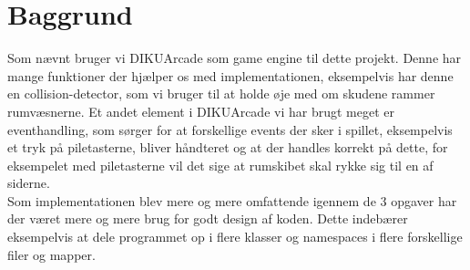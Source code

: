 \section{Baggrund}
Som nævnt bruger vi DIKUArcade som game engine til dette projekt. Denne har mange funktioner der hjælper os med implementationen, eksempelvis har denne en collision-detector, som vi bruger til at holde øje med om skudene rammer rumvæsnerne. Et andet element i DIKUArcade vi har brugt meget er eventhandling, som sørger for at forskellige events der sker i spillet, eksempelvis et tryk på piletasterne, bliver håndteret og at der handles korrekt på dette, for eksempelet med piletasterne vil det sige at rumskibet skal rykke sig til en af siderne.\\
Som implementationen blev mere og mere omfattende igennem de 3 opgaver har der været mere og mere brug for godt design af koden. Dette indebærer eksempelvis at dele programmet op i flere klasser og namespaces i flere forskellige filer og mapper.

